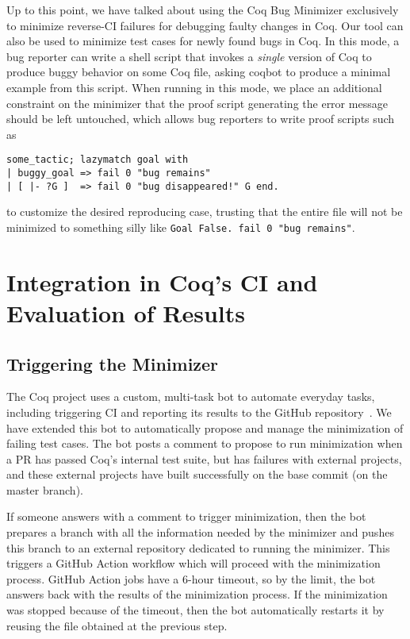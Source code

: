\documentclass[a4paper,USenglish,cleveref,autoref,thm-restate]{lipics-v2021}
\begin{document}
Up to this point, we have talked about using the Coq Bug Minimizer exclusively to minimize reverse-CI failures for debugging faulty changes in Coq.
Our tool can also be used to minimize test cases for newly found bugs in Coq.
In this mode, a bug reporter can write a shell script that invokes a \emph{single} version of Coq to produce buggy behavior on some Coq file, asking coqbot to produce a minimal example from this script.
When running in this mode, we place an additional constraint on the minimizer that the proof script generating the error message should be left untouched,
which allows bug reporters to write proof scripts such as
\begin{verbatim}
some_tactic; lazymatch goal with
| buggy_goal => fail 0 "bug remains"
| [ |- ?G ]  => fail 0 "bug disappeared!" G end.
\end{verbatim}
to customize the desired reproducing case, trusting that the entire file will not be minimized to something silly like \verb|Goal False. fail 0 "bug remains"|.





\section{Integration in Coq's CI and Evaluation of Results}\label{sec:evaluation}

\subsection{Triggering the Minimizer}

The Coq project uses a custom, multi-task bot to automate everyday tasks, including triggering CI and reporting its results to the GitHub repository~\cite{zimmermann:hal-03479327}. We have extended this bot to automatically propose and manage the minimization of failing test cases. The bot posts a comment to propose to run minimization when a PR has passed Coq's internal test suite, but has failures with external projects, and these external projects have built successfully on the base commit (on the master branch).

If someone answers with a comment to trigger minimization, then the bot prepares a branch with all the information needed by the minimizer and pushes this branch to an external repository dedicated to running the minimizer. This triggers a GitHub Action workflow which will proceed with the minimization process. GitHub Action jobs have a 6-hour timeout, so by the limit, the bot answers back with the results of the minimization process. If the minimization was stopped because of the timeout, then the bot automatically restarts it by reusing the file obtained at the previous step.
\end{document}
